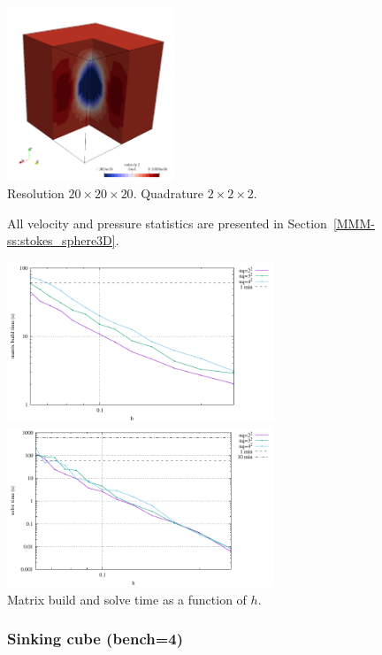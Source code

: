 \begin{center}
\includegraphics[width=5cm]{python_codes/fieldstone_82/results/bench3/w.png}\\
{\captionfont Resolution $20\times 20\times 20$. Quadrature $2\times 2 \times 2$.} 
\end{center}

All velocity and pressure statistics are presented in Section~\ref{MMM-ss:stokes_sphere3D}.

\begin{center}
\includegraphics[width=8cm]{python_codes/fieldstone_82/results/bench3/build.pdf}
\includegraphics[width=8cm]{python_codes/fieldstone_82/results/bench3/solve.pdf}\\
{\captionfont Matrix build and solve time as a function of $h$.}
\end{center}

\subsubsection*{Sinking cube (bench=4)}

